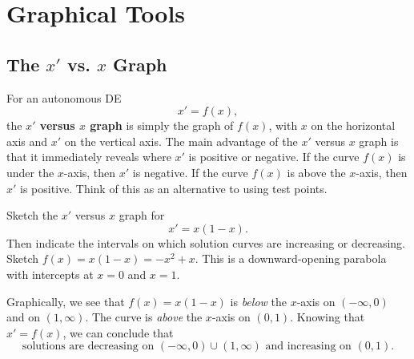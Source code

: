\documentclass[09pt,letterpaper]{article}
\begin{document}
\section{Graphical Tools}

\subsection{The $x'$ vs. $x$ Graph}

For an autonomous DE
\[
    x'=f(x),
\]
the \textbf{$x'$ versus $x$ graph} is simply the graph of $f(x)$, with $x$
on the horizontal axis and $x'$ on the vertical axis. The main advantage of the $x'$ versus $x$ graph is that it immediately reveals where $x'$ is positive or negative. If the curve $f(x)$ is under the $x$-axis, then $x'$ is negative. If the curve $f(x)$ is above the $x$-axis, then $x'$ is positive. Think of this as an alternative to using test points. 


\begin{example}[3]{
Sketch the $x'$ versus $x$ graph for 
\[
    x'=x(1-x).
\]
Then indicate the intervals on which solution curves are increasing or decreasing.
}
Sketch $f(x)=x(1-x)=-x^2+x$. This is a downward-opening parabola with intercepts at $x=0$ and $x=1$. 
\begin{figure}[H]
    \centering
{}
\end{figure}
Graphically, we see that $f(x)=x(1-x)$ is \textit{below} the $x$-axis on $(-\infty,0)$ and on $(1,\infty)$. The curve is \textit{above} the $x$-axis on $(0,1)$. Knowing that $x'=f(x)$, we can conclude that 
\[
\boxed{
\text{solutions are decreasing on }(-\infty,0)\cup(1,\infty)
\text{ and increasing on }(0,1).
}
\]
\end{example}
\end{document}
